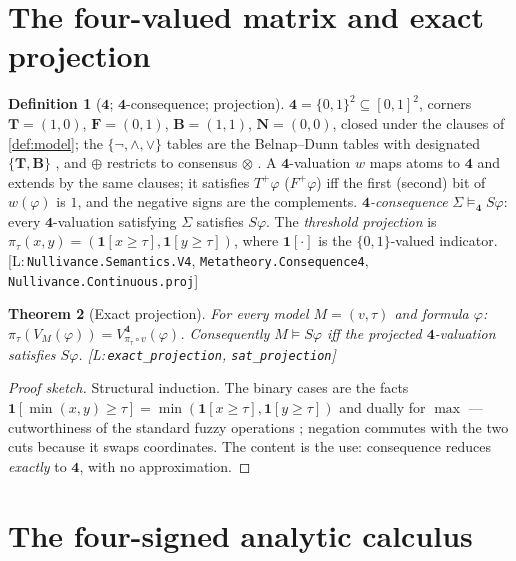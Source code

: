 \documentclass[11pt,a4paper]{article}
\newtheorem{theorem}{Theorem}[section]
\theoremstyle{definition}
\newtheorem{definition}[theorem]{Definition}
\newcommand{\FOUR}{\mathbf{4}}
\newcommand{\vT}{\mathbf{T}}
\newcommand{\vF}{\mathbf{F}}
\newcommand{\vB}{\mathbf{B}}
\newcommand{\vN}{\mathbf{N}}
\newcommand{\hmz}{\oplus}                       %
\newcommand{\proj}[1]{\pi_{#1}}
\newcommand{\ind}[1]{\mathbf{1}[#1]}            %
\newcommand{\Tp}{T^{+}}\newcommand{\Tm}{T^{-}}
\newcommand{\Fp}{F^{+}}\newcommand{\Fm}{F^{-}}
\newcommand{\lean}[1]{\texttt{#1}}
\begin{document}
\section{The four-valued matrix and exact projection}\label{sec:projection}

\begin{definition}[$\FOUR$; $\FOUR$-consequence; projection]\label{def:four}
$\FOUR=\{0,1\}^2\subseteq[0,1]^2$, corners $\vT=(1,0)$, $\vF=(0,1)$,
$\vB=(1,1)$, $\vN=(0,0)$, closed under the clauses of \cref{def:model};
the $\{\lnot,\wedge,\vee\}$ tables are the Belnap--Dunn tables with
designated $\{\vT,\vB\}$ \cite{belnap1977useful,dunn1976intuitive}, and
$\hmz$ restricts to consensus $\otimes$ \cite{arieli1996reasoning}. A
$\FOUR$-valuation $w$ maps atoms to $\FOUR$ and extends by the same
clauses; it satisfies $\Tp\varphi$ ($\Fp\varphi$) iff the first (second)
bit of $w(\varphi)$ is $1$, and the negative signs are the complements.
\emph{$\FOUR$-consequence} $\Sigma\models_{\FOUR}S\varphi$: every
$\FOUR$-valuation satisfying $\Sigma$ satisfies $S\varphi$. The
\emph{threshold projection} is
$\proj{\tau}(x,y)=(\ind{x\ge\tau},\ind{y\ge\tau})$, where $\ind{\cdot}$ is
the $\{0,1\}$-valued indicator.
[L:\,\lean{Nullivance.Semantics.V4}, \lean{Metatheory.Consequence4},
\lean{Nullivance.Continuous.proj}]
\end{definition}

\begin{theorem}[Exact projection]\label{thm:projection}
For every model $M=(v,\tau)$ and formula $\varphi$:
$\proj{\tau}(V_M(\varphi)) = V^{\FOUR}_{\proj{\tau}\circ v}(\varphi)$.
Consequently $M\models S\varphi$ iff the projected $\FOUR$-valuation
satisfies $S\varphi$. [L:\,\lean{exact\_projection}, \lean{sat\_projection}]
\end{theorem}
\begin{proof}[Proof sketch]
Structural induction. The binary cases are the facts
$\ind{\min(x,y)\ge\tau}=\min(\ind{x\ge\tau},\ind{y\ge\tau})$ and dually for
$\max$ --- cutworthiness of the standard fuzzy operations
\cite[\S\S~1.3--1.4]{klir1995fuzzy}; negation commutes with the two cuts because it swaps
coordinates. The content is the use: consequence reduces \emph{exactly} to
$\FOUR$, with no approximation.
\end{proof}

\section{The four-signed analytic calculus}\label{sec:calculus}
\end{document}
